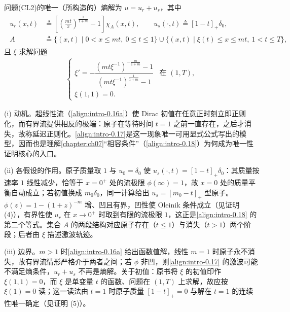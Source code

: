 \documentclass[../main.tex]{subfiles}
\begin{document}
\begin{proposition}\label{proposition:intro-0.2.4}
问题(CL2)的唯一（所构造的）熵解为 $u=u_r+u_s$，其中
\begin{align}
\begin{aligned}
u_r(x,t) &\triangleq  \left[\left(\frac{mt}{x}\right)^{\frac{1}{1+m}}-1\right]\chi_A(x,t),\qquad
u_s(\cdot,t) \triangleq  [1-t]_+\delta_0,\\
A &\triangleq  \{(x,t)\mid 0<x\leqslant mt,\ 0\leqslant t\leqslant1\}
\cup\{(x,t)\mid \xi(t)\leqslant x\leqslant mt,\ 1<t\leqslant T\},
\end{aligned}
\label{align:intro-0.17}
\end{align}
且 $\xi$ 求解问题
\begin{align*}
\begin{cases}
\xi' = -\dfrac{(mt\xi^{-1})^{-\frac{m}{1+m}}-1}{(mt\xi^{-1})^{\frac{1}{1+m}}-1} & \text{在 }(1,T),\\
\xi(1,1)=0.
\end{cases}
\end{align*}
\end{proposition}

\begin{remark}\label{remark:intro-0.2.4-动机}
(i) 动机。超线性流（\eqref{align:intro-0.16a}）使 Dirac 初值在任意正时刻立即正则化，而有界流提供相反的极端：原子在等待时间 $t=1$ 之前一直存在，之后才消失，故称延迟正则化。\eqref{align:intro-0.17}是这一现象唯一可用显式公式写出的模型，因而也是理解\cref{chapter:ch07}“相容条件”（\eqref{align:intro-0.18}）为何成为唯一性证明核心的入口。

(ii) 各假设的作用。原子质量取 $1$ 与 $u_0=\delta_0$ 使 $u_s(\cdot,t)=[1-t]_+\delta_0$：其质量按速率 $1$ 线性减少，恰等于 $x=0^+$ 处的流极限 $\phi(\infty)=1$，故 $x=0$ 处的质量平衡自动成立；若初值换成 $m_0\delta_0$，同一计算给出 $u_s=[m_0-t]_+$ 型原子。$\phi(z)=1-(1+z)^{-m}$ 增、凹且有界，凹性使 Oleinik 条件成立（见证明 (4)），有界性使 $u_r$ 在 $x\to0^+$ 时取到有限的流极限 $1$，这正是\eqref{align:intro-0.18} 的第二个等式。集合 $A$ 的两段结构对应原子存在（$t\leqslant1$）与消失（$t>1$）两个阶段；后者由 $\xi$ 描述激波轨迹。

(iii) 边界。$m>1$ 时\eqref{align:intro-0.16a} 给出函数值解，线性 $m=1$ 时原子永不消失，故有界流情形严格介于两者之间；若 $\phi$ 非凹，则\eqref{align:intro-0.17} 的激波可能不满足熵条件，$u_r+u_s$ 不再是熵解。关于初值：原书将 $\xi$ 的初值印作 $\xi(1,1)=0$，而 $\xi$ 是单变量 $t$ 的函数、问题在 $(1,T)$ 上求解，故应按 $\xi(1)=0$ 读；这一读法由 $t=1$ 时原子质量 $[1-t]_+=0$ 与解在 $t=1$ 的连续性唯一确定（见证明 (5)）。
\end{remark}
\end{document}
